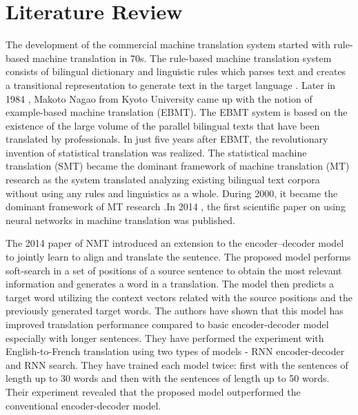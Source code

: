 \documentclass[12pt, a4paper]{report}
\begin{document}
\section{Literature Review}
The development of the commercial machine translation system started with rule-based machine translation in 70s. The rule-based machine translation system consists of bilingual dictionary and linguistic rules which parses text and creates a transitional representation to generate text in the target language \cite{freecodecamp.org_2018} \cite{systran}. Later in 1984 \cite{freecodecamp.org_2018}, Makoto Nagao from Kyoto University came up with the notion of example-based machine translation (EBMT). The EBMT system is based on the existence of the large volume of the parallel bilingual texts that have been translated by professionals. In just five years after EBMT, the revolutionary invention of statistical translation was realized. The statistical machine translation (SMT) became the dominant framework of machine translation (MT) research as the system translated analyzing existing bilingual text corpora without using any rules and linguistics as a whole. During 2000, it became the dominant framework of MT research \cite{freecodecamp.org_2018} \cite{hutchins2005history}.In 2014 \cite{freecodecamp.org_2018}, the first scientific paper on using neural networks in machine translation was published.

The 2014 paper \cite{bahdanau2014neural} of NMT introduced an extension to the encoder–decoder model to jointly learn
to align and translate the sentence. The proposed model performs soft-search in a set of positions of a source sentence to obtain the most relevant information and generates a word in a translation. The model then predicts a target word utilizing the context vectors related with the source positions and the previously generated target words. The authors have shown that this model has improved translation performance compared to basic encoder-decoder model especially with longer sentences. They have performed the experiment with English-to-French translation using two types of models -  RNN encoder-decoder and RNN search. They have trained each model twice: first with the sentences of length up to 30 words and then with the sentences of length up to 50 words. Their experiment revealed that the proposed model outperformed the conventional encoder-decoder model.
\end{document}
